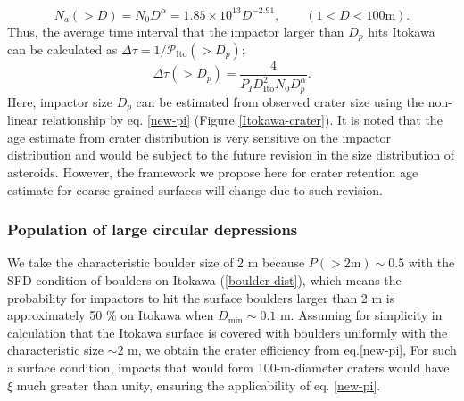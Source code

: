 \documentclass[3p,authoryear]{elsarticle}
\begin{document}
\begin{equation}
	N_a(>D)=N_0D^{\alpha}=1.85\times 10^{13}D^{-2.91},\qquad (1<D<100\text{m}).
\end{equation}
Thus, the average time interval that the impactor larger than $D_p$ hits Itokawa can be calculated as $\Delta \tau =1/\mathcal{P}_\text{Ito}(>D_p)$;
\begin{equation}
	\Delta \tau(>D_p) = \frac{4}{P_ID_\text{Ito}^2N_0 D_p^{\alpha}}.
\end{equation}
Here, impactor size $D_p$ can be estimated from observed crater size using the non-linear relationship by eq. \eqref{new-pi} (Figure \ref{Itokawa-crater}).
It is noted that the age estimate from crater distribution is very sensitive on the impactor distribution and would be subject to the future revision in the size distribution of asteroids. However, the framework we propose here for crater retention age estimate for coarse-grained surfaces will change due to such revision.

\subsubsection{Population of large circular depressions}
We take the characteristic boulder size of 2 m because $P(>2 \text{m})\sim 0.5$ with the SFD condition of boulders on Itokawa (\ref{boulder-dist}), which means the probability for impactors to hit the surface boulders larger than 2 m is approximately 50 \% on Itokawa when $D_\text{min} \sim 0.1$ m.
Assuming for simplicity in calculation that the Itokawa surface is covered with boulders uniformly with the characteristic size $\sim2$ m, we obtain the crater efficiency from eq.\eqref{new-pi},
For such a surface condition, impacts that would form 100-m-diameter craters would have $\xi$ much greater than unity, ensuring the applicability of eq. \eqref{new-pi}.
\end{document}
